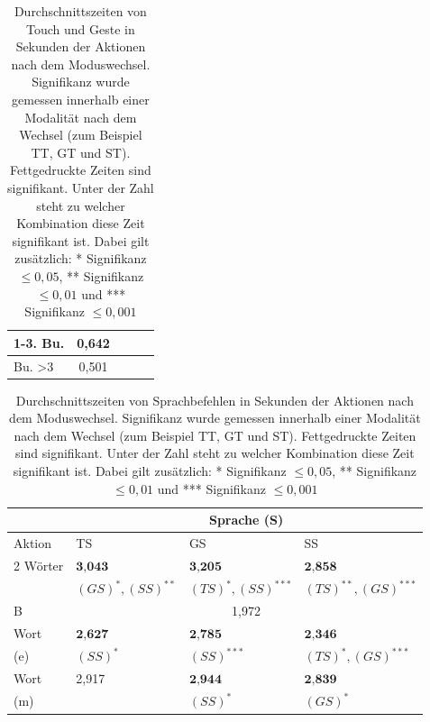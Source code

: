 \begin{table}[ht]
\begin{tabular}{|l|l|l|l|l|l|l|}
		\hline	
		1-3. Bu.		& \multicolumn{3}{|c|}{0,642} &				& 			&  	 \\
		\hline		
		Bu. >3 					& \multicolumn{3}{|c|}{0,501} &				& 		&  		\\
		\hline	
  \end{tabular}
	\caption[Zweite Vereinfachung Durchschnittszeiten von Touch und Geste nach dem Moduswechsel]{Durchschnittszeiten von Touch und Geste in Sekunden der Aktionen nach dem Moduswechsel. Signifikanz wurde gemessen innerhalb einer Modalität nach dem Wechsel (zum Beispiel TT, GT und ST). Fettgedruckte Zeiten sind signifikant. Unter der Zahl steht zu welcher Kombination diese Zeit signifikant ist. Dabei gilt zusätzlich: * Signifikanz $\leq 0,05$, ** Signifikanz $\leq 0,01$ und *** Signifikanz $\leq 0,001$}
	\label{tab:OperatorzeitenNachWechsel3_TouchGeste}
\end{table}
\begin{table}[ht]
  \centering
	\begin{tabular}{|l|l|l|l|}
		\hline
		& \multicolumn{3}{|c|}{Sprache (S)}\\
		\hline
		Aktion 					&TS 	& GS 	& SS\\
		\hline
		2 Wörter		&	$\textbf{3,043}$						& $\textbf{3,205}$							& $\textbf{2,858}$\\
								&	\small{$(GS)^{*},(SS)^{**}$}	& \small{$(TS)^{*},(SS)^{***}$}	& \small{$(TS)^{**},(GS)^{***}$}\\
		\hline	
		B						&\multicolumn{3}{|c|}{1,972}\\			
		\hline
		Wort   		& $\textbf{2,627}$	& $\textbf{2,785}$		& $\textbf{2,346}$ \\
		(e)						& \small{$(SS)^{*}$}& \small{$(SS)^{***}$}	& \small{$(TS)^{*},(GS)^{***}$} \\
		\hline
		Wort  			& 2,917 & $\textbf{2,944}$ 	& $\textbf{2,839}$ \\
		(m)						& 			& \small{$(SS)^{*}$} & \small{$(GS)^{*}$} \\
		\hline	
  \end{tabular}
	\caption[Zweite Vereinfachung Durchschnittszeiten von Sprache nach dem Moduswechsel]{Durchschnittszeiten von Sprachbefehlen in Sekunden der Aktionen nach dem Moduswechsel. Signifikanz wurde gemessen innerhalb einer Modalität nach dem Wechsel (zum Beispiel TT, GT und ST). Fettgedruckte Zeiten sind signifikant. Unter der Zahl steht zu welcher Kombination diese Zeit signifikant ist. Dabei gilt zusätzlich: * Signifikanz $\leq 0,05$, ** Signifikanz $\leq 0,01$ und *** Signifikanz $\leq 0,001$}
	\label{tab:OperatorzeitenNachWechsel3_Sprache}
\end{table}

